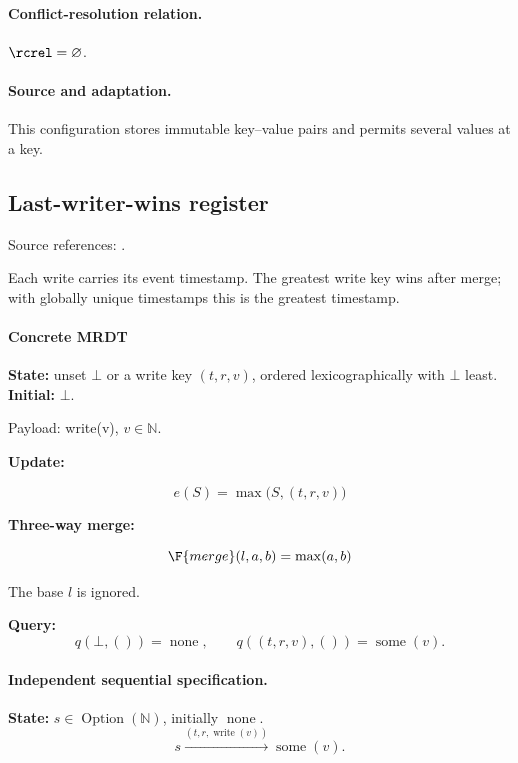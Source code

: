 \paragraph{Conflict-resolution relation.}
$\rcrel=\varnothing$.


\paragraph{Source and adaptation.}
This configuration stores immutable key--value pairs and permits several values at a key.


\subsection{Last-writer-wins register}
\label{app:dt-lww-register}

\noindent Source references: \cite{shapiro2011comprehensive}.



Each write carries its event timestamp. The greatest write key wins after merge; with globally unique timestamps this is the greatest timestamp.

\paragraph{Concrete MRDT}
\textbf{State:} unset $\bot$ or a write key $(t,r,v)$, ordered lexicographically with $\bot$ least. \textbf{Initial:} $\bot$.

Payload: write(v), $v\in\mathbb{N}$.

\textbf{Update:}

\[
e(S)=\max\bigl(S,(t,r,v)\bigr)
\]


\textbf{Three-way merge:}

\[
\F{merge}(l,a,b)=\max(a,b)
\]


The base $l$ is ignored.

\textbf{Query:}
\[
q(\bot,())=\operatorname{none},\qquad q((t,r,v),())=\operatorname{some}(v).
\]

\paragraph{Independent sequential specification.}
\textbf{State:} $s\in\operatorname{Option}(\mathbb N)$, initially $\operatorname{none}$.
\[
s\xrightarrow{(t,r,\operatorname{write}(v))}\operatorname{some}(v).
\]


